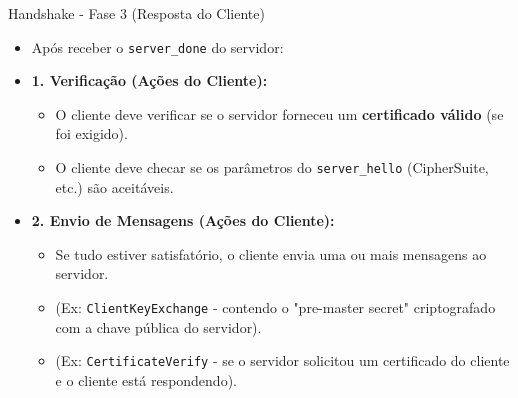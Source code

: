 \begin{frame}{Handshake - Fase 3 (Resposta do Cliente)}
    \begin{itemize}
        \item Após receber o \texttt{server\_done} do servidor:

        \item \textbf{1. Verificação (Ações do Cliente):}
              \begin{itemize}
                  \item O cliente deve verificar se o servidor forneceu um \textbf{certificado válido} (se foi exigido).
                  \item O cliente deve checar se os parâmetros do \texttt{server\_hello} (CipherSuite, etc.) são aceitáveis.
              \end{itemize}

        \item \textbf{2. Envio de Mensagens (Ações do Cliente):}
              \begin{itemize}
                  \item Se tudo estiver satisfatório, o cliente envia uma ou mais mensagens ao servidor.
                  \item (Ex: \texttt{ClientKeyExchange} - contendo o "pre-master secret" criptografado com a chave pública do servidor).
                  \item (Ex: \texttt{CertificateVerify} - se o servidor solicitou um certificado do cliente e o cliente está respondendo).
              \end{itemize}
    \end{itemize}
\end{frame}

